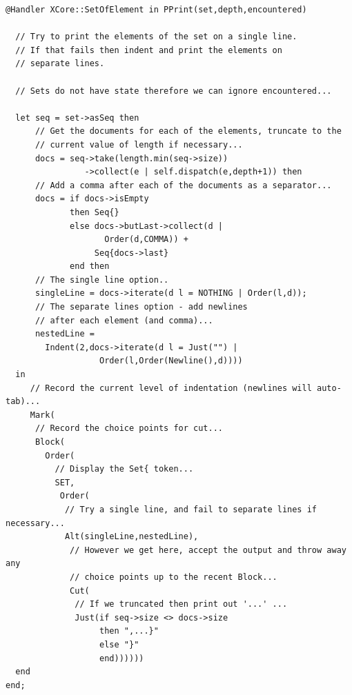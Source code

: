 \begin{lstlisting}
@Handler XCore::SetOfElement in PPrint(set,depth,encountered) 

  // Try to print the elements of the set on a single line.
  // If that fails then indent and print the elements on
  // separate lines.
  
  // Sets do not have state therefore we can ignore encountered...
  
  let seq = set->asSeq then
      // Get the documents for each of the elements, truncate to the 
      // current value of length if necessary...   
      docs = seq->take(length.min(seq->size))
                ->collect(e | self.dispatch(e,depth+1)) then    
      // Add a comma after each of the documents as a separator...  
      docs = if docs->isEmpty 
             then Seq{} 
             else docs->butLast->collect(d | 
                    Order(d,COMMA)) + 
                  Seq{docs->last} 
             end then  
      // The single line option..
      singleLine = docs->iterate(d l = NOTHING | Order(l,d));
      // The separate lines option - add newlines 
      // after each element (and comma)...
      nestedLine = 
        Indent(2,docs->iterate(d l = Just("") | 
                   Order(l,Order(Newline(),d))))
  in 
     // Record the current level of indentation (newlines will auto-tab)...
     Mark(  
      // Record the choice points for cut...
      Block(
        Order(
          // Display the Set{ token...
          SET,
           Order(
            // Try a single line, and fail to separate lines if necessary...
            Alt(singleLine,nestedLine),
             // However we get here, accept the output and throw away any
             // choice points up to the recent Block...
             Cut(
              // If we truncated then print out '...' ...
              Just(if seq->size <> docs->size 
                   then ",...}" 
                   else "}" 
                   end))))))
  end     
end;
\end{lstlisting}

